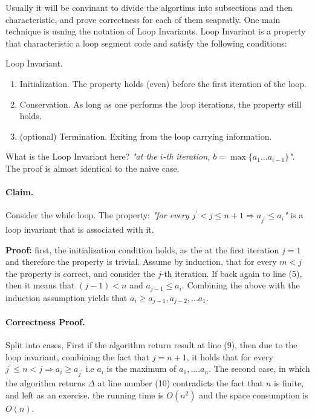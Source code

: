 Usually it will be convinant to divide the algortims into subsections and then characteristic, and prove correctness for each of them seapratly. One main technique is usning the notation of Loop Invariants. Loop Invariant is a property that characteristic a loop segment code  and satisfy the following conditions: 


\begin{defbox}{Loop Invariant.} 
\begin{enumerate}
    \item Initialization. The property holds (even) before the first iteration of the loop.   
    \item Conservation. As long as one performs the loop iterations, the property still holds.
    \item (optional) Termination. Exiting from the loop carrying information.
\end{enumerate}
\end{defbox}


What is the Loop Invariant here? \textit{"at the \(i\)-th iteration, \(b = \max{ \{ a_1 ... a_{i-1} \} } \)"}. The proof is almost identical to the naive case.   

\paragraph{Claim.} Consider the while loop. The property: \textit{"for every \(j^\prime < j \le n+1 \Rightarrow a_{j^\prime} \le a_i \)"} is a loop invariant that is associated with it. 

\textbf{Proof:} first, the initialization condition holds, as the at the first iteration \(j=1\) and therefore the property is trivial.
Assume by induction, that for every \(m < j\) the property is correct, and consider the \(j\)-th iteration. If back again to line (5), then it means that \( (j-1) < n\) and \( a_{j-1} \le a_{i} \). Combining the above with the induction assumption yields that \(a_i \ge a_{j-1},a_{j-2}, ... a_{1}\).    

\paragraph{Correctness Proof.} Split into cases, First if the algorithm return result at line (9), then due to the loop invariant, combining the fact that \( j = n + 1\), it holds that for every \(j^\prime  \le n < j \Rightarrow a_i \ge a_{j^\prime} \)  i.e \(a_i\) is the maximum of \(a_1, .... a_n \). The second case, in which the algorithm returns \( \Delta \) at line number (10) contradicts the fact that \(n\) is finite, and left as an exercise.  the running time is \( O(n^2) \) and the space consumption is \(O(n)\). 




